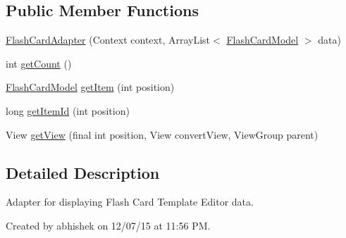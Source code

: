 \subsection*{Public Member Functions}
\begin{DoxyCompactItemize}
\item 
\hyperlink{classorg_1_1buildmlearn_1_1toolkit_1_1templates_1_1FlashCardAdapter_a865c27585b7f0653f0d963bf301c2303}{Flash\-Card\-Adapter} (Context context, Array\-List$<$ \hyperlink{classorg_1_1buildmlearn_1_1toolkit_1_1templates_1_1FlashCardModel}{Flash\-Card\-Model} $>$ data)
\item 
int \hyperlink{classorg_1_1buildmlearn_1_1toolkit_1_1templates_1_1FlashCardAdapter_af4d1bfcc51a9f945d4a0f0afe12adfc2}{get\-Count} ()
\item 
\hyperlink{classorg_1_1buildmlearn_1_1toolkit_1_1templates_1_1FlashCardModel}{Flash\-Card\-Model} \hyperlink{classorg_1_1buildmlearn_1_1toolkit_1_1templates_1_1FlashCardAdapter_a30e4366accf2cec71f6b642e84d610ea}{get\-Item} (int position)
\item 
long \hyperlink{classorg_1_1buildmlearn_1_1toolkit_1_1templates_1_1FlashCardAdapter_a01bdc573acbbd2ab5965df2756095bff}{get\-Item\-Id} (int position)
\item 
View \hyperlink{classorg_1_1buildmlearn_1_1toolkit_1_1templates_1_1FlashCardAdapter_ab93c5e59e63f2604b2a782b9a094179a}{get\-View} (final int position, View convert\-View, View\-Group parent)
\end{DoxyCompactItemize}


\subsection{Detailed Description}
Adapter for displaying Flash Card Template Editor data. 

Created by abhishek on 12/07/15 at 11\-:56 P\-M. 

